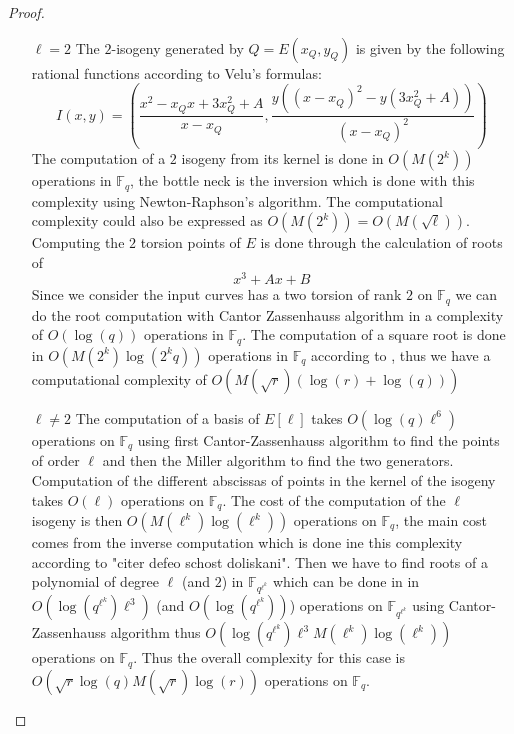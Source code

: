 \documentclass{article}
\theoremstyle{plain}
\theoremstyle{definition}
\theoremstyle{remark}
\begin{document}
\begin{proof}
\begin{enumerate}
\item[$\ell = 2$]
The $2$-isogeny generated by $Q=E(x_Q,y_Q)$ is given by the following rational functions according to Velu's formulas:
\[
I(x,y)=(\frac{x^2-x_Qx+3x_Q^2+A}{x-x_Q},\frac{y((x-x_Q)^2-y(3x_Q^2+A))}{(x-x_Q)^2})
\]
The computation of a $2$ isogeny from its kernel is done in $O(M(2^k))$ operations in $\mathbb{F}_q$, the bottle neck is the inversion which is done with this complexity using Newton-Raphson's algorithm. The computational complexity could also be expressed as $O(M(2^k))=O(M(\sqrt{\ell}))$.
\newline
Computing the $2$ torsion points of $E$ is done through the calculation of roots of 
\[
x^3+Ax+B
\]
Since we consider the input curves has a two torsion of rank $2$ on $\mathbb{F}_q$ we can do the root computation with Cantor Zassenhauss algorithm in a complexity of $O( \log(q))$ operations in $\mathbb{F}_q$. 
The computation of a square root is done in $O(M(2^k)\log(2^kq))$ operations in $\mathbb{F}_q$ according to \cite{DBLP:journals/dcc/DoliskaniS15}, thus we have a computational complexity of $O(M(\sqrt{r})(\log(r)+\log(q)))$
\item[$\ell \neq 2$]The computation of a basis of $E[\ell]$ takes $O(\log(q)\ell^6 )$ operations on $\mathbb{F}_q$ using first Cantor-Zassenhauss algorithm to find the points of order $\ell$ and then the Miller algorithm to find  the two generators. Computation of the different abscissas of points in the kernel of the isogeny takes $O(\ell )$ operations on $\mathbb{F}_q$. The cost of the computation of the $\ell$ isogeny is then $O(M(\ell^k)\log(\ell^k))$ operations on $\mathbb{F}_{q}$, the main cost comes from the inverse computation which is done ine this complexity according to "citer defeo schost doliskani". Then we have to find roots of a polynomial of degree $\ell$ (and $2$) in $\mathbb{F}_{q^{\ell^k}}$ which can be done in in $O(\log(q^{\ell^k})\ell^3)$ (and $O(\log(q^{\ell^k}))$) operations on $\mathbb{F}_{q^{\ell^k}}$ using Cantor-Zassenhauss algorithm thus $O(\log(q^{\ell^k})\ell^3 M(\ell^k)\log(\ell^k))$ operations on $\mathbb{F}_q$. Thus the overall complexity for this case is $O(\sqrt{r} \log(q) M(\sqrt{r})\log(r))$ operations on $\mathbb{F}_q$.
\end{enumerate}
\end{proof}
\end{document}
